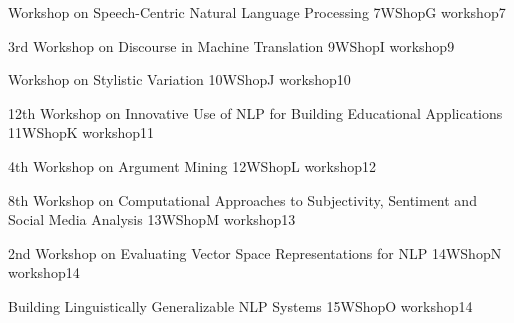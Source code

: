 \begin{wsschedule}
  {Workshop on Speech-Centric Natural Language Processing}
  {7}{WShopG}
  {workshop7}
  {\WShopLocG}
  
\end{wsschedule}
%
%  



\begin{wsschedule}
  {3rd Workshop on Discourse in Machine Translation}
  {9}{WShopI}
  {workshop9}
  {\WShopLocI}
  
\end{wsschedule}

\begin{wsschedule}
  {Workshop on Stylistic Variation}
  {10}{WShopJ}
  {workshop10}
  {\WShopLocJ}
  
\end{wsschedule}

\begin{wsschedule}
  {12th Workshop on Innovative Use of NLP for Building Educational Applications}
  {11}{WShopK}
  {workshop11}
  {\WShopLocK}
  
\end{wsschedule}

\begin{wsschedule}
  {4th Workshop on Argument Mining}
  {12}{WShopL}
  {workshop12}
  {\WShopLocL}
  
\end{wsschedule}

\begin{wsschedule}
  {8th Workshop on Computational Approaches to Subjectivity, Sentiment and Social Media Analysis}
  {13}{WShopM}
  {workshop13}
  {\WShopLocM}
  
\end{wsschedule}

\begin{wsschedule}
  {2nd Workshop on Evaluating Vector Space Representations for NLP}
  {14}{WShopN}
  {workshop14}
  {\WShopLocN}
  
\end{wsschedule}

\begin{wsschedule}
  {Building Linguistically Generalizable NLP Systems}
  {15}{WShopO}
  {workshop14}
  {\WShopLocO}
  
\end{wsschedule}


\clearpage{\thispagestyle{emptyheader}\cleardoublepage}
